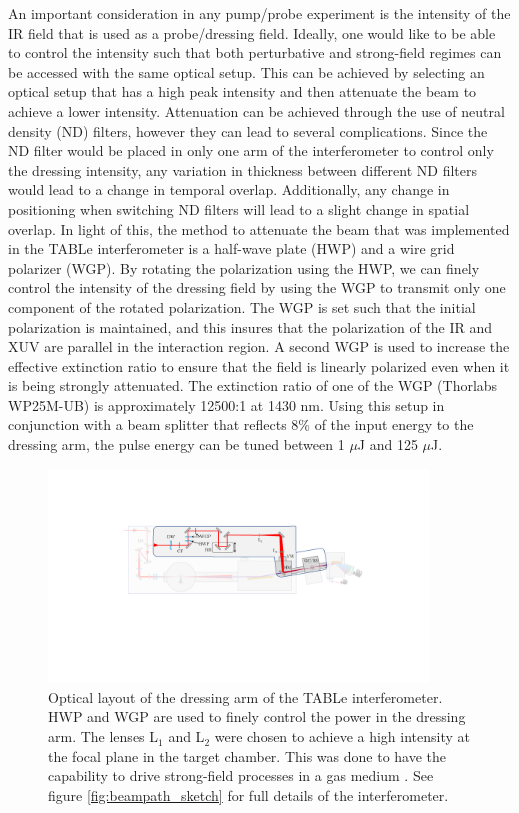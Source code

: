 An important consideration in any pump/probe experiment is the intensity of the IR field that is used as a probe/dressing field. Ideally, one would like to be able to control the intensity such that both perturbative and strong-field regimes can be accessed with the same optical setup.  This can be achieved by selecting an optical setup that has a high peak intensity and then attenuate the beam to achieve a lower intensity.  Attenuation can be achieved through the use of neutral density (ND) filters, however they can lead to several complications.  Since the ND filter would be placed in only one arm of the interferometer to control only the dressing intensity, any variation in thickness between different ND filters would lead to a change in temporal overlap.  Additionally, any change in positioning when switching ND filters will lead to a slight change in spatial overlap. In light of this, the method to attenuate the beam that was implemented in the TABLe interferometer is a half-wave plate (HWP) and a wire grid polarizer (WGP).  By rotating the polarization using the HWP, we can finely control the intensity  of the dressing field by using the WGP to transmit only one component of the rotated polarization.  The WGP is set such that the initial polarization is maintained, and this insures that the polarization of the IR and XUV are parallel in the interaction region.  A second WGP is used to increase the effective extinction ratio to ensure that the field is linearly polarized even when it is being strongly attenuated.  The extinction ratio of one of the WGP (Thorlabs WP25M-UB) is approximately 12500:1 at 1430 nm.  Using this setup in conjunction with a beam splitter that reflects 8\% of the input energy to the dressing arm, the pulse energy can be tuned between 1 $\mu$J and 125 $\mu$J.

\begin{figure}
	\centering
	\includegraphics[width=0.9\textwidth]{figures/Beamline/dressing_arm.pdf}
	\caption[Optical layout of dressing arm]{Optical layout of the dressing arm of the TABLe interferometer. HWP and WGP are used to finely control the power in the dressing arm.  The lenses L$_1$ and L$_2$ were chosen to achieve a high intensity at the focal plane in the target chamber.  This was done to have the capability to drive strong-field processes in a gas medium \cite{kiesewetterDynamicsNearThresholdAttosecond2019}.  See figure \ref{fig:beampath_sketch} for full details of the interferometer.}
	\label{fig:dressing_arm}
\end{figure}

